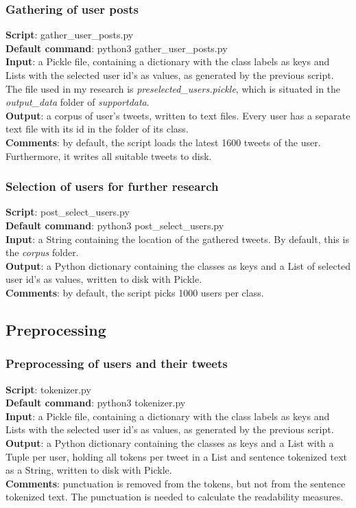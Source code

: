 \documentclass[
10pt, %
a4paper, %
oneside, %
headinclude,footinclude, %
] {book}%
\begin{document}
\subsubsection{Gathering of user posts}
\textbf{Script}:	gather\_user\_posts.py \\
\textbf{Default command}: python3 gather\_user\_posts.py \\
\textbf{Input}:  a Pickle file, containing a dictionary with the class labels as keys and Lists with the selected user id's as values, as generated by the previous script. The file used in my research is \textit{preselected\_users.pickle}, which is situated in the \textit{output\_data} folder of \textit{supportdata}. \\
\textbf{Output}:  a corpus of user's tweets, written to text files. Every user has a separate text file with its id in the folder of its class. \\
\textbf{Comments}: by default, the script loads the latest 1600 tweets of the user. Furthermore, it writes all suitable tweets to disk.

\subsubsection{Selection of users for further research}
\textbf{Script}:	post\_select\_users.py \\
\textbf{Default command}: python3 post\_select\_users.py \\
\textbf{Input}:  a String containing the location of the gathered tweets. By default, this is the \textit{corpus} folder. \\
\textbf{Output}:  a Python dictionary containing the classes as keys and a List of selected user id's as values, written to disk with Pickle. \\
\textbf{Comments}: by default, the script picks 1000 users per class.

\subsection{\textbf{Preprocessing}}
\subsubsection{Preprocessing of users and their tweets}
\textbf{Script}:	tokenizer.py \\
\textbf{Default command}: python3 tokenizer.py \\
\textbf{Input}:  a Pickle file, containing a dictionary with the class labels as keys and Lists with the selected user id's as values, as generated by the previous script.  \\
\textbf{Output}:  a Python dictionary containing the classes as keys and a List with a Tuple per user, holding all tokens per tweet in a List and sentence tokenized text as a String, written to disk with Pickle. \\
\textbf{Comments}: punctuation is removed from the tokens, but not from the sentence tokenized text. The punctuation is needed to calculate the readability measures.
\end{document}
